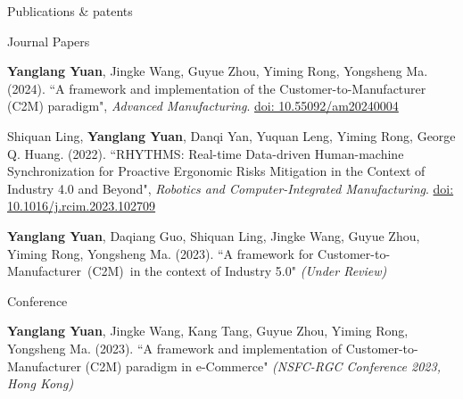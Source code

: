 \documentclass{resume} %
\begin{document}
\begin{rSection}{Publications \& patents}

    \begin{rSubsection}{Journal Papers}{}{}{}

        \item {\textbf{Yanglang Yuan}, Jingke Wang, Guyue Zhou, Yiming Rong, Yongsheng Ma. (2024). “A framework and implementation of the Customer-to-Manufacturer (C2M) paradigm", \textit{Advanced Manufacturing}}. \href{https://doi.org/10.55092/am20240004}{{doi: 10.55092/am20240004}}

        \item Shiquan Ling,{ \textbf{Yanglang Yuan}, Danqi Yan, Yuquan Leng, Yiming Rong, George Q. Huang. (2022). “RHYTHMS: Real-time Data-driven Human-machine Synchronization for Proactive Ergonomic Risks Mitigation in the Context of Industry 4.0 and Beyond", \textit{Robotics and Computer-Integrated Manufacturing}}. \href{https://doi.org/10.1016/j.rcim.2023.102709}{{doi: 10.1016/j.rcim.2023.102709}}

        \item {\textbf{Yanglang Yuan}, Daqiang Guo, Shiquan Ling, Jingke Wang, Guyue Zhou, Yiming Rong, Yongsheng Ma. (2023). “A framework for Customer-to-Manufacturer~(C2M)~in the context of Industry 5.0"} \textit{(Under Review)}

        \vspace{-5pt}    
    \end{rSubsection}

        \begin{rSubsection}{Conference}{}{}{}

        \item {\textbf{Yanglang Yuan}, Jingke Wang, Kang Tang, Guyue Zhou, Yiming Rong, Yongsheng Ma. (2023). “A framework and implementation of Customer-to-Manufacturer (C2M) paradigm in e-Commerce"} \textit{(NSFC-RGC Conference 2023, Hong Kong)}

        \vspace{-5pt}    
    \end{rSubsection}




\end{rSection}
\end{document}
